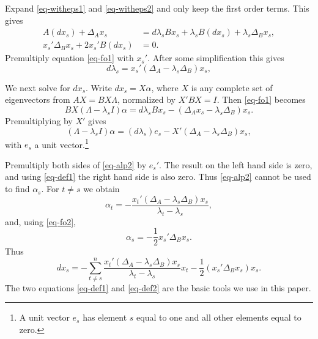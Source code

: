 \documentclass[
  12pt,
  letterpaper,
  DIV=11,
  numbers=noendperiod]{scrartcl}
\begin{document}
Expand \eqref{eq-witheps1} and \eqref{eq-witheps2} and only keep the
first order terms. This gives \begin{subequations}
\begin{align}
A(dx_s)+\Delta_Ax_s&=d\lambda_sBx_s+\lambda_sB(dx_s)+\lambda_s\Delta_Bx_s,\label{eq-fo1}\\
x_s'\Delta_Bx_s+2x_s'B(dx_s)&=0.\label{eq-fo2}
\end{align}
\end{subequations} Premultiply equation \eqref{eq-fo1} with \(x_s'\).
After some simplification this gives \begin{equation}
d\lambda_s=x_s'(\Delta_A-\lambda_s\Delta_B)x_s,\label{eq-def1}
\end{equation}

We next solve for \(dx_s\). Write \(dx_s=X\alpha\), where \(X\) is any
complete set of eigenvectors from \(AX=BX\Lambda\), normalized by
\(X'BX=I\). Then \eqref{eq-fo1} becomes \begin{equation}
BX(\Lambda-\lambda_sI)\alpha=d\lambda_s Bx_s-(\Delta_Ax_s-\lambda_s\Delta_B)x_s.\label{eq-alp1}
\end{equation} Premultiplying by \(X'\) gives \begin{equation}
(\Lambda-\lambda_sI)\alpha=(d\lambda_s)e_s-X'(\Delta_A-\lambda_s\Delta_B)x_s,\label{eq-alp2}
\end{equation} with \(e_s\) a unit
vector.\footnote{A unit vector $e_s$ has element $s$ equal to one and all other elements equal to zero.}

Premultiply both sides of \eqref{eq-alp2} by \(e_s'\). The result on the
left hand side is zero, and using \eqref{eq-def1} the right hand side is
also zero. Thus \eqref{eq-alp2} cannot be used to find \(\alpha_s\). For
\(t\not= s\) we obtain \begin{equation}
\alpha_t=-\frac{x_t'(\Delta_A-\lambda_s\Delta_B)x_s}{\lambda_t-\lambda_s},\label{eq-alp3}
\end{equation} and, using \eqref{eq-fo2}, \begin{equation}
\alpha_s=-\frac12x_s'\Delta_Bx_s.\label{eq-alp3}
\end{equation} Thus \begin{equation}
dx_s=-\sum_{t\not= s}^n\frac{x_t'(\Delta_A-\lambda_s\Delta_B)x_s}{\lambda_t-\lambda_s}x_t-\frac12(x_s'\Delta_Bx_s)x_s.\label{eq-def2}
\end{equation} The two equations \eqref{eq-def1} and \eqref{eq-def2} are
the basic tools we use in this paper.
\end{document}
